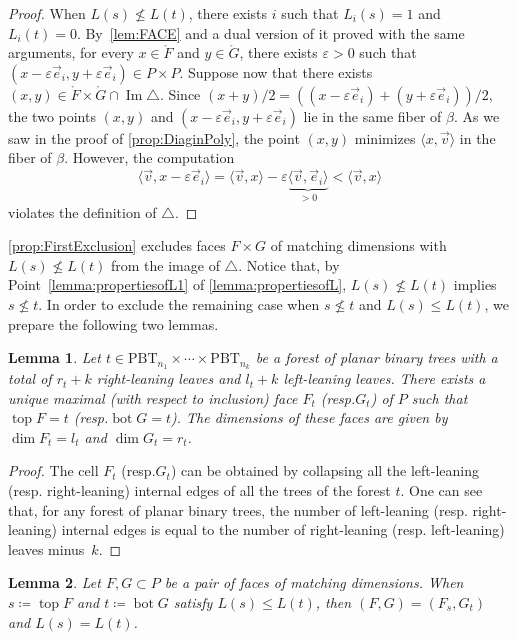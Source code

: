 \documentclass[11pt]{article}
\newcommand{\resp}{resp.\xspace}
\numberwithin{equation}{section}\providecommand{\No}{}
\theoremstyle{plain}
\newtheorem{lemma}{Lemma}
\theoremstyle{definition}
\newcommand{\Tam}[1]{\mathrm{PBT}_{#1}}
\DeclareMathOperator{\tp}{top}
\DeclareMathOperator{\bm}{bot}
\newcommand{\ang}[1]{\langle #1\rangle}
\DeclareMathOperator{\im}{\mathrm{Im}}
\begin{document}
\begin{proof}
When $L(s)\not\leq L(t)$, there exists $i$ such that $L_i(s) = 1$ and $L_i(t) = 0$.
By~\cref{lem:FACE} and a dual version of it proved with the same arguments,
for every $x\in \mathring{F}$ and $y\in \mathring{G}$, there exists $\varepsilon>0$ such that $(x-\varepsilon \vec e_i, y+\varepsilon \vec e_i) \in P\times P$.
Suppose now that there exists $(x,y)\in \mathring{F}\times \mathring{G} \cap \im \triangle$.
Since $(x+y)/2 = ((x-\varepsilon\vec e_i)+(y+\varepsilon\vec e_i))/2$, the two points $(x, y)$ and $(x-\varepsilon\vec e_i, y+\varepsilon\vec e_i)$ lie in the same fiber of $\beta$. As we saw in the proof of
\cref{prop:DiaginPoly}, the point $(x,y)$ minimizes $\ang{x, \vec v}$ in the fiber of $\beta$.
However, the computation
\[
\ang{\vec v, x-\varepsilon \vec e_i}=\ang{\vec v, x}-\varepsilon\underbrace{\ang{\vec v, \vec e_i}}_{>0}
<\ang{\vec v, x}
\]
violates the definition of $\triangle$.
\end{proof}

\cref{prop:FirstExclusion} excludes
faces $F\times G$ of matching dimensions with $L(s)\not\leq L(t)$
from the image of $\triangle$.
Notice that, by Point~\eqref{lemma:propertiesofL1} of \cref{lemma:propertiesofL}, $L(s)\not\leq L(t)$ implies $s\not \leq t$.
In order to exclude the remaining case when $s\not\leq t$ and $L(s)\leq L(t)$, we prepare the following two lemmas.

\begin{lemma}\label{lem:UniqueFG}
Let $t\in \Tam{n_1}\times \cdots \times \Tam{n_k}$ be a forest of planar binary trees with a total of $r_t+k$ right-leaning leaves and $l_t+k$ left-leaning leaves. There exists a unique maximal (with respect to inclusion) face $F_t$ (\resp $G_t$) of $P$ such that \hbox{$\tp F\!=\!t$} (\resp $\bm G = t$). The dimensions of these faces are given by $\dim F_t =l_t$ and $\dim G_t = r_t$.
\end{lemma}

\begin{proof}
The cell $F_t$ (\resp $G_t$) can be obtained by collapsing all the left-leaning (\resp right-leaning) internal edges of all the trees of the forest $t$. One can see that, for any forest of planar binary trees, the number of left-leaning (\resp right-leaning) internal edges is equal to the number of right-leaning (\resp left-leaning) leaves minus~$k$.
\end{proof}

\begin{lemma}\label{lemma:Matching}
Let $F,G\subset P$ be a pair of faces of matching dimensions.
When $s\coloneqq \tp F$ and $t\coloneqq \bm G$ satisfy $L(s)\leq L(t)$, then $(F, G) = (F_s, G_t)$ and $L(s)=L(t)$.
\end{lemma}
\end{document}
